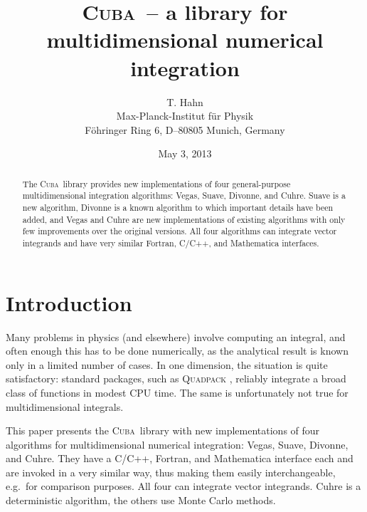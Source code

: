 \documentclass[12pt]{article}
\makeatletter
\newcommand\cuba{\textsc{Cuba}}
\newcommand\eg{e.g.\ }
\def\reportno#1{\gdef\@reportno{#1}}
\makeatother
\begin{document}
\reportno{MPP--2004--40\\hep--ph/0404043}

\title{\cuba\ -- a library for multidimensional numerical integration}

\author{T. Hahn \\
Max-Planck-Institut f\"ur Physik \\
F\"ohringer Ring 6, D--80805 Munich, Germany}

\date{May 3, 2013}

\maketitle

\begin{abstract}
The \cuba\ library provides new implementations of four general-purpose
multidimensional integration algorithms: Vegas, Suave, Divonne, and
Cuhre.  Suave is a new algorithm, Divonne is a known algorithm to which
important details have been added, and Vegas and Cuhre are new
implementations of existing algorithms with only few improvements over
the original versions.  All four algorithms can integrate vector
integrands and have very similar Fortran, C/C++, and Mathematica
interfaces.
\end{abstract}


\section{Introduction}

Many problems in physics (and elsewhere) involve computing an integral,
and often enough this has to be done numerically, as the analytical
result is known only in a limited number of cases.  In one dimension,
the situation is quite satisfactory: standard packages, such as
\textsc{Quadpack} \cite{quadpack}, reliably integrate a broad class of
functions in modest CPU time.  The same is unfortunately not true for
multidimensional integrals.

This paper presents the \cuba\ library with new implementations of four
algorithms for multidimensional numerical integration: Vegas, Suave,
Divonne, and Cuhre.  They have a C/C++, Fortran, and Mathematica
interface each and are invoked in a very similar way, thus making them
easily interchangeable, \eg for comparison purposes.  All four can
integrate vector integrands.  Cuhre is a deterministic algorithm, the
others use Monte Carlo methods.
\end{document}

